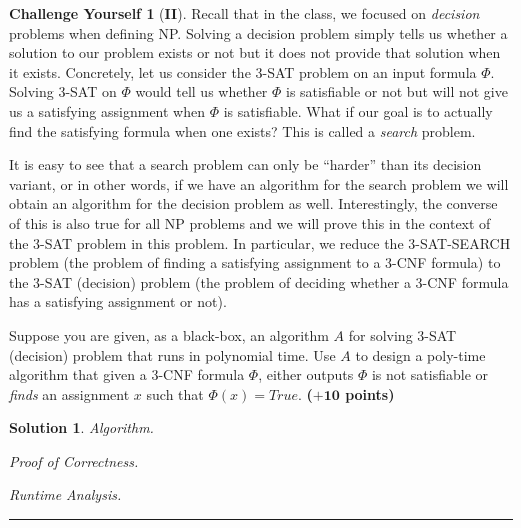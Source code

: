 \documentclass{article}
\theoremstyle{definition}
\newtheorem*{challenge}{Challenge Yourself}
\def\fline{\rule{0.75\linewidth}{0.5pt}}
\newcommand{\finishline}{\begin{center}\fline\end{center}}
\newtheorem*{solution*}{Solution}
\newenvironment{solution}{\begin{solution*}}{{\finishline} \end{solution*}}
\newcommand{\grade}[1]{\hfill{\textbf{($\mathbf{#1}$ points)}}}
\begin{document}
\bigskip

\begin{challenge}[\textbf{II}] 
	Recall that in the class, we  focused on \emph{decision} problems when defining NP. Solving a decision problem simply tells us whether a solution to our problem exists or not but  it does not provide that solution when it 
	exists. Concretely, let us consider the 3-SAT problem on an input formula $\Phi$. Solving 3-SAT on $\Phi$ would  tell us whether $\Phi$ is satisfiable or not but will not give us a satisfying assignment when $\Phi$ is satisfiable. 
	What if our goal is to actually find the satisfying formula when one exists? This is called a \emph{search} problem. 
	
	It is easy to see that a search problem can only be ``harder'' than its decision variant, or in other words, if we have an algorithm for the search problem we will obtain an algorithm for the decision problem as well. Interestingly, the converse 
	of this is also true for all NP problems and we will prove this in the context of the 3-SAT problem in this problem. In particular, we reduce the 3-SAT-SEARCH problem (the problem of finding a satisfying assignment to a 3-CNF formula) 
	to the 3-SAT (decision) problem (the problem of deciding whether a 3-CNF formula has a satisfying assignment or not). 
	
	Suppose you are given, as a black-box, an algorithm $A$ for solving 3-SAT (decision) problem that runs in polynomial time. Use $A$ to design a poly-time algorithm that given a 3-CNF formula $\Phi$, either outputs $\Phi$ is not satisfiable or 
	\emph{finds} an assignment $x$ such that $\Phi(x) = True$. \grade{+10}
\end{challenge}

\begin{solution}
	 
	\emph{Algorithm.}
	
	\emph{Proof of Correctness.}
	
	\emph{Runtime Analysis.}
	
\end{solution}
\end{document}
